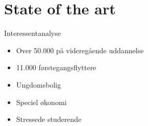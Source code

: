 \section{State of the art}
\begin{frame}{Interessentanalyse}{}

\begin{itemize}
\item Over 50.000 på videregående uddannelse
\item 11.000 førstegangsflyttere
\item Ungdomsbolig
\item Speciel økonomi
\item Stressede studerende
\end{itemize}
\end{frame}